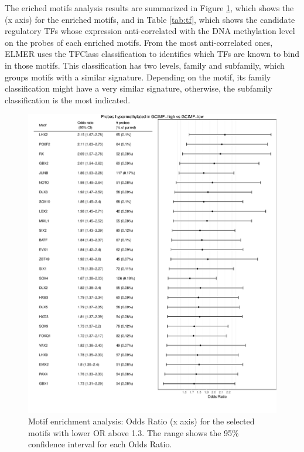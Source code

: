 The eriched motifs analysis results are summarized in Figure \ref{tab:or},
which shows the  (x axis) for the enriched motifs, and in Table  \ref{tab:tf},
which shows the candidate regulatory TFs whose expression anti-correlated
with the DNA methylation level on the probes of each enriched motifs.
 From the most anti-correlated ones, ELMER uses the TFClass
 classification \cite{doi:10.1093/nar/gku1064} to identifies
 which TFs are  known to bind in those motifs.
 This classification has two levels, family and subfamily,
  which groups motifs with a similar signature.
  Depending on the motif, its family classification might have a
  very similar signature, otherwise, the subfamily classification is the most indicated.

\begin{center}
\begin{figure}[h!]
\includegraphics[width=16cm]{images/gcimp_motif_enrichment.pdf}
\caption[G-CIMP analysis: Odds Ratio plot]{\label{tab:or}Motif enrichment analysis: Odds Ratio (x axis) for the selected motifs with lower OR above 1.3. The range shows the 95\% confidence interval for each Odds Ratio.}
\end{figure}

\end{center}


